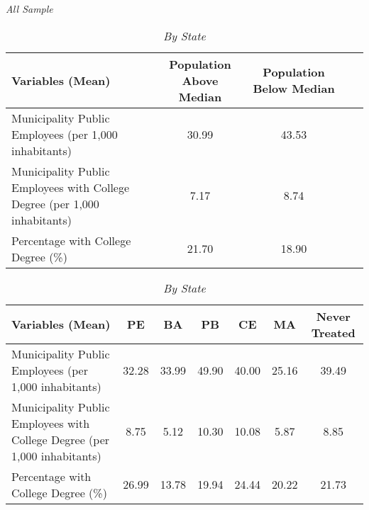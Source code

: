 \documentclass{article}
\begin{document}
\begin{table}[htbp]
\centering
\label{tab:municipal_employees}
\begin{threeparttable}
\begin{subtable}{\textwidth}
\centering
\caption{\textit{All Sample}}
\begin{adjustbox}{max width=\textwidth}
\begin{tabular}{lcccc}
  \toprule
\textbf{Variables (Mean)} & Population Above Median & Population Below Median \\
 \midrule
Municipality Public Employees (per 1,000 inhabitants) &  30.99 & 43.53 \\ 
Municipality Public Employees with College Degree (per 1,000 inhabitants) & 7.17 & 8.74 \\ 
Percentage with College Degree (\%) & 21.70 & 18.90 \\ 
  \bottomrule
\end{tabular}
\end{adjustbox}
\end{subtable}

\begin{subtable}{\textwidth}
\centering
\caption{\textit{By State}}
\begin{adjustbox}{max width=\textwidth}
\begin{tabular}{lcccccc}
  \toprule
\textbf{Variables (Mean)} & PE & BA & PB & CE & MA & Never Treated \\
  \midrule
Municipality Public Employees (per 1,000 inhabitants) & 32.28 & 33.99 & 49.90 & 40.00 & 25.16 & 39.49 \\ 
Municipality Public Employees with College Degree (per 1,000 inhabitants) & 8.75 & 5.12 & 10.30 & 10.08 & 5.87 & 8.85 \\ 
Percentage with College Degree (\%) & 26.99 & 13.78 & 19.94 & 24.44 & 20.22 & 21.73 \\ 
 \bottomrule
\end{tabular}
\end{adjustbox}
\end{subtable}
\end{threeparttable}
\end{table}
\end{document}
